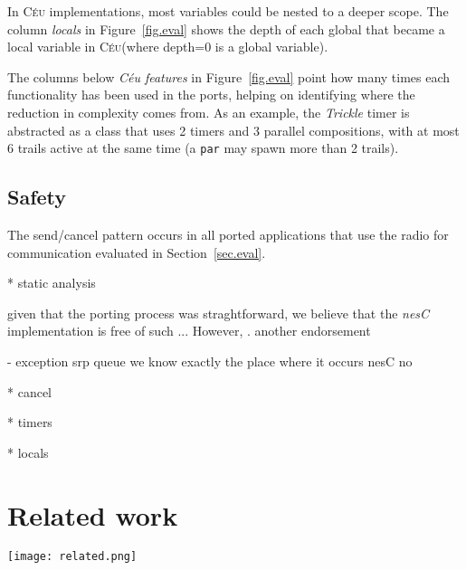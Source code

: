 \documentclass[10pt]{sensys-proc}
\newcommand{\CEU}{\textsc{C\'{e}u}\xspace}
\newcommand{\code}[1] {{\small{\texttt{#1}}}}
\begin{document}
In \CEU implementations, most variables could be nested to a deeper scope.
The column \emph{locals} in Figure~\ref{fig.eval} shows the depth of each 
global that became a local variable in \CEU (where depth=0 is a global 
variable).

The columns below \emph{C\'eu features} in Figure~\ref{fig.eval} point how many 
times each functionality has been used in the ports, helping on identifying 
where the reduction in complexity comes from.
As an example, the \emph{Trickle} timer is abstracted as a class that uses 2 
timers and 3 parallel compositions, with at most 6 trails active at the same 
time (a \code{par} may spawn more than 2 trails).


\subsection{Safety}

The send/cancel pattern occurs in all ported applications that use the radio 
for communication evaluated in Section~\ref{sec.eval}.


* static analysis

given that the porting process was straghtforward, we believe that the 
\emph{nesC} implementation is free of such ...
However, .
another endorsement

- exception srp queue
we know exactly the place where it occurs
nesC no

* cancel

* timers

* locals



\section{Related work}
\label{sec.related}

\begin{figure*}[t]
\texttt{[image: related.png]}
\caption{ Table of features found in related works to \CEU.
\label{fig.related}
}
\end{figure*}
\end{document}
